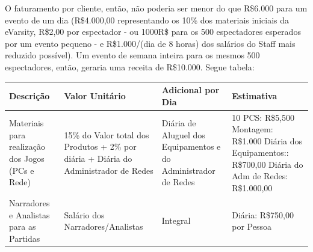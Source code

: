 \documentclass[a4paper, 12pt]{paper}
\begin{document}
O faturamento por cliente, então, não poderia ser menor do que R\$6.000 para um evento de um dia (R\$4.000,00 representando os 10\% dos materiais iniciais da eVarsity, R\$2,00 por espectador - ou 1000R\$ para os 500 espectadores esperados por um evento pequeno - e R\$1.000/(dia de 8 horas) dos salários do Staff mais reduzido possível). Um evento de semana inteira para os mesmos 500 espectadores, então, geraria uma receita de R\$10.000. Segue tabela:
\begin{table}[ht]
	\centering
	\begin{tabular}{p{3.5cm}p{3.5cm}p{3.5cm}p{3.5cm}}
		\hline
		\cellcolor{gray}Descrição&\cellcolor{gray}Valor Unitário&\cellcolor{gray}Adicional por Dia&\cellcolor{gray}Estimativa\\
		\hline
		Materiais para realização dos Jogos (PCs e Rede)&15\% do Valor total dos Produtos + 2\% por diária + Diária do Administrador de Redes&Diária de Aluguel dos Equipamentos e do Administrador de Redes&10 PCS: R\$5,500
		Montagem: R\$1.000
		Diária dos Equipamentos:: R\$700,00
		Diária do Adm de Redes: R\$1.000,00\\
		\hline
		Narradores e Analistas para as Partidas&Salário dos Narradores/Analistas&Integral&Diária: R\$750,00 por Pessoa\\
		\hline
	\end{tabular}
\end{table}
\end{document}
